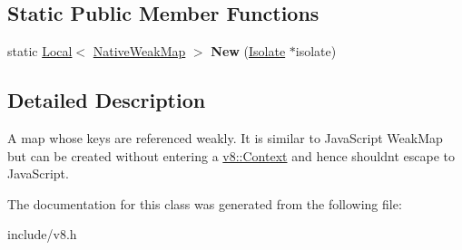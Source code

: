 \subsection*{Static Public Member Functions}
\begin{DoxyCompactItemize}
\item 
static \hyperlink{classv8_1_1_local}{Local}$<$ \hyperlink{classv8_1_1_native_weak_map}{Native\+Weak\+Map} $>$ {\bfseries New} (\hyperlink{classv8_1_1_isolate}{Isolate} $\ast$isolate)\hypertarget{classv8_1_1_native_weak_map_afeb513d14fbb8d4537e4a051c71fbf31}{}\label{classv8_1_1_native_weak_map_afeb513d14fbb8d4537e4a051c71fbf31}

\end{DoxyCompactItemize}


\subsection{Detailed Description}
A map whose keys are referenced weakly. It is similar to Java\+Script Weak\+Map but can be created without entering a \hyperlink{classv8_1_1_context}{v8\+::\+Context} and hence shouldn\textquotesingle{}t escape to Java\+Script. 

The documentation for this class was generated from the following file\+:\begin{DoxyCompactItemize}
\item 
include/v8.\+h\end{DoxyCompactItemize}
